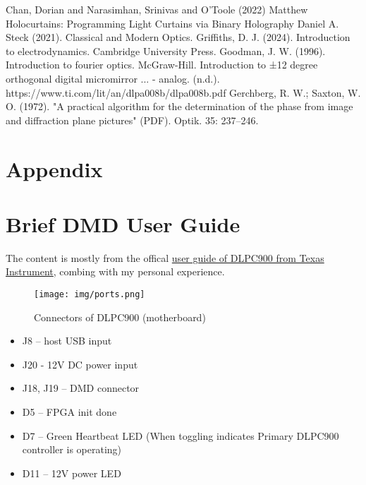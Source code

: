 \documentclass[10pt,journal,compsoc]{IEEEtran}
\begin{document}
{
\small

\begin{thebibliography}{9}
Chan, Dorian and Narasimhan, Srinivas and O'Toole (2022) Matthew Holocurtains: Programming Light Curtains via Binary Holography
Daniel A. Steck (2021). Classical and Modern Optics. 
Griffiths, D. J. (2024). Introduction to electrodynamics. Cambridge University Press. 
Goodman, J. W. (1996). Introduction to fourier optics. McGraw-Hill. 
Introduction to ±12 degree orthogonal digital micromirror ... - analog. (n.d.). https://www.ti.com/lit/an/dlpa008b/dlpa008b.pdf 
 Gerchberg, R. W.; Saxton, W. O. (1972). "A practical algorithm for the determination of the phase from image and diffraction plane pictures" (PDF). Optik. 35: 237–246.
\end{thebibliography}
}

\newpage 

\appendix

\section{Appendix}

\section*{Brief DMD User Guide}
\label{sec:user_guide}
The content is mostly from the offical \href{https://www.ti.com/lit/pdf/dlpu101}{user guide of DLPC900 from Texas Instrument}, combing with my personal experience.
\begin{figure}[!h]
    \centering
    \texttt{[image: img/ports.png]}
    \caption{Connectors of DLPC900 (motherboard)}
    \label{fig:fig13}
\end{figure}

\begin{itemize}
    \item J8 – host USB input
    \item J20 - 12V DC power input
    \item J18, J19 – DMD connector
    \item D5 – FPGA init done
    \item D7 – Green Heartbeat LED (When toggling indicates Primary DLPC900 controller is operating)
    \item D11 – 12V power LED
\end{itemize}
\end{document}
